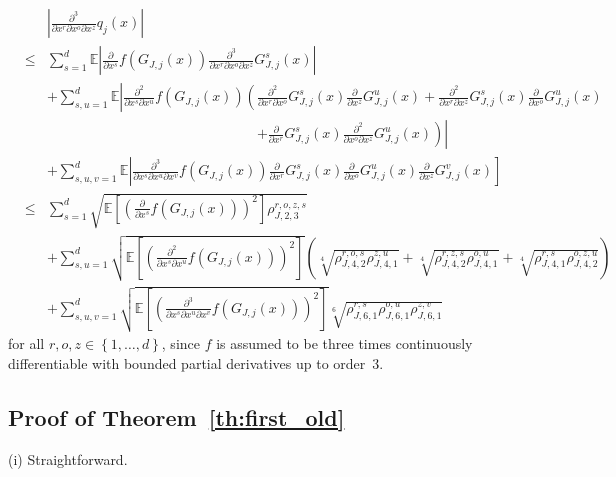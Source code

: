 \documentclass[11pt,a4paper]{amsart}
\theoremstyle{plain}
\theoremstyle{definition}
\theoremstyle{remark}
\numberwithin{equation}{section}
\newcommand*{\EE}{\mathbb E}
\begin{document}
\begin{eqnarray*}
&&\left|\frac{\partial^3}{\partial x^r\partial x^o\partial x^z}q_j(x)\right|
\\
&\le&\sum_{s=1}^d\EE\left|\frac{\partial }{\partial x^s}f(G_{J,j}(x))\frac{\partial^3}{\partial x^r\partial x^o\partial x^z}G_{J,j}^s(x)\right|\\
&&+\sum_{s,u=1}^d\EE\left|\frac{\partial^2 }{\partial x^s\partial x^u}f(G_{J,j}(x))\left(\frac{\partial^2}{\partial x^r\partial x^o}G_{J,j}^s(x)\frac{\partial}{\partial x^z}G_{J,j}^u(x)+\frac{\partial^2}{\partial x^r\partial x^z}G_{J,j}^s(x)\frac{\partial}{\partial x^o}G_{J,j}^u(x)\right.\right.\\
&&\phantom{+\sum_{s,u=1}^d\EE\left|\frac{\partial^2 }{\partial x^s\partial x^u}f(G_{J,j}(x))\left(\right.\right.}\left.\left.+\frac{\partial}{\partial x^r}G_{J,j}^s(x)\frac{\partial^2}{\partial x^o\partial x^z}G_{J,j}^u(x)\right)\right|\\
&&+\sum_{s,u,v=1}^d\EE\left|\frac{\partial^3 }{\partial x^s\partial x^u\partial x^v}f(G_{J,j}(x))\frac{\partial}{\partial x^r}G_{J,j}^s(x)\frac{\partial}{\partial x^o}G_{J,j}^u(x)\frac{\partial}{\partial x^z}G_{J,j}^v(x)\right]\\
&\le &\sum_{s=1}^d\sqrt{\EE\left[\left(\frac{\partial }{\partial x^s}f(G_{J,j}(x))\right)^2\right]\rho_{J,2,3}^{r,o,z,s}}\\
&&+\sum_{s,u=1}^d\sqrt{\EE\left[\left(\frac{\partial^2 }{\partial x^s\partial x^u}f(G_{J,j}(x))\right)^2\right]}\left(\sqrt[4]{\rho_{J,4,2}^{r,o,s}\rho_{J,4,1}^{z,u}}+\sqrt[4]{\rho_{J,4,2}^{r,z,s}\rho_{J,4,1}^{o,u}}+\sqrt[4]{\rho_{J,4,1}^{r,s}\rho_{J,4,2}^{o,z,u}}\right)\\
&&+\sum_{s,u,v=1}^d\sqrt{\EE\left[\left(\frac{\partial^3 }{\partial x^s\partial x^u\partial x^v}f(G_{J,j}(x))\right)^2\right]}\sqrt[6]{\rho_{J,6,1}^{r,s}\rho_{J,6,1}^{o,u}\rho_{J,6,1}^{z,v}}
\end{eqnarray*}
for all $r,o,z\in\left\{1,\ldots,d\right\}$, since $f$ is assumed to be three times continuously differentiable with bounded partial derivatives up to order~3.









\subsection{Proof of Theorem~\protect\ref{th:first_old}}
(i) Straightforward.
\end{document}
